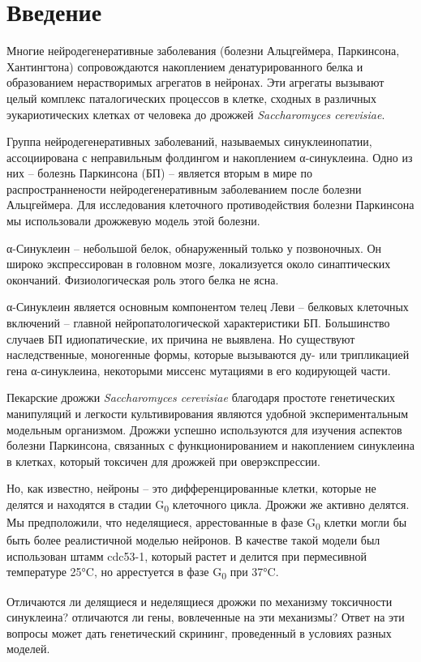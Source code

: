 
\section{Введение}

Многие нейродегенеративные заболевания (болезни Альцгеймера, Паркинсона, Хантингтона) сопровождаются накоплением денатурированного белка и образованием нерастворимых агрегатов в нейронах. Эти агрегаты вызывают целый комплекс паталогических процессов в клетке, сходных в различных эукариотических клетках от человека до дрожжей \emph{Saccharomyces cerevisiae}. 

Группа нейродегенеративных заболеваний, называемых синуклеинопатии, ассоциирована с неправильным фолдингом и накоплением α-синуклеина. Одно из них -- болезнь Паркинсона (БП) -- является вторым в мире по распространнености нейродегенеративным заболеванием после болезни Альцгеймера.  Для исследования клеточного противодействия болезни Паркинсона мы использовали дрожжевую модель этой болезни.

α-Синуклеин -- небольшой белок, обнаруженный только у позвоночных. Он широко экспрессирован в головном мозге, локализуется около синаптических окончаний. Физиологическая роль этого белка не ясна. 

α-Синуклеин является основным компонентом телец Леви -- белковых клеточных включений -- главной нейропатологической характеристики БП. Большинство случаев БП идиопатические, их причина не выявлена. Но существуют наследственные, моногенные формы, которые вызываются ду- или трипликацией гена α-синуклеина, некоторыми миссенс мутациями в его кодирующей части.

Пекарские дрожжи \emph{Saccharomyces cerevisiae} благодаря простоте генетических манипуляций и легкости культивирования являются удобной экспериментальным модельным организмом. Дрожжи успешно используются для изучения аспектов болезни Паркинсона, связанных с функционированием и накоплением синуклеина в клетках, который токсичен для дрожжей при оверэкспрессии.

Но, как известно, нейроны -- это дифференцированные клетки, которые не делятся и находятся в стадии G\textsubscript{0} клеточного цикла. Дрожжи же активно делятся. Мы предположили, что неделящиеся, аррестованные в фазе G\textsubscript{0} клетки могли бы быть более реалистичной моделью нейронов. В качестве такой модели был использован штамм cdc53-1, который растет и делится при пермесивной температуре 25°C, но аррестуется в фазе G\textsubscript{0} при 37°C.

Отличаются ли делящиеся и неделящиеся дрожжи по механизму токсичности синуклеина? отличаются ли гены, вовлеченные на эти механизмы? Ответ на эти вопросы может дать генетический скрининг, проведенный в условиях разных моделей.

